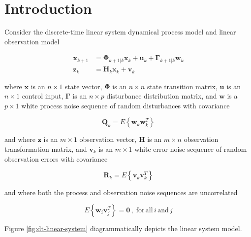 \section{Introduction}
\label{Introduction}

Consider the discrete-time linear system dynamical process model and linear observation model

\begin{equation*}
    \begin{aligned}
        \mathbf{x}_{k+1} &= \mathbf{\Phi}_{k+1|k} \mathbf{x}_k + \mathbf{u}_k + \mathbf{\Gamma}_{k+1|k} \mathbf{w}_k \\
        \mathbf{z}_k &= \mathbf{H}_k \mathbf{x}_k + \mathbf{v}_k
    \end{aligned}
\end{equation*}

where $\mathbf{x}$ is an $n \times 1$ state vector,
$\mathbf{\Phi}$ is an $n \times n$ state transition matrix,
$\mathbf{u}$ is an $n \times 1$ control input,
$\mathbf{\Gamma}$ is an $n \times p$ disturbance distribution matrix,
and $\mathbf{w}$ is a $p \times 1$ white process noise sequence of random disturbances with covariance

\begin{equation*}
    \mathbf{Q}_k = E \left\{ \mathbf{w}_k \mathbf{w}_k^T \right\}
\end{equation*}

and where $\mathbf{z}$ is an $m \times 1$ observation vector,
$\mathbf{H}$ is an $m \times n$ observation transformation matrix,
and $\mathbf{v}_k$ is an $m \times 1$ white error noise sequence of random observation errors with covariance

\begin{equation*}
    \mathbf{R}_k = E \left\{ \mathbf{v}_k \mathbf{v}_k^T \right\}
\end{equation*}

and where both the process and observation noise sequences are uncorrelated

\begin{equation*}
    E \left\{ \mathbf{w}_i \mathbf{v}_j^T \right\} = \mathbf{0} \, , \phantom{.} \mathrm{for} \, \mathrm{all} \, i \, \mathrm{and} \, j
\end{equation*}

Figure \ref{fig:dt-linear-system} diagrammatically depicts the linear system model.

